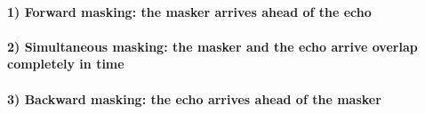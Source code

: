\documentclass[11pt]{article}
\begin{document}
\hypertarget{forward-masking-the-masker-arrives-ahead-of-the-echo}{%
\paragraph{1) Forward masking: the masker arrives ahead of the
echo}\label{forward-masking-the-masker-arrives-ahead-of-the-echo}}

\hypertarget{simultaneous-masking-the-masker-and-the-echo-arrive-overlap-completely-in-time}{%
\paragraph{2) Simultaneous masking: the masker and the echo arrive
overlap completely in
time}\label{simultaneous-masking-the-masker-and-the-echo-arrive-overlap-completely-in-time}}

\hypertarget{backward-masking-the-echo-arrives-ahead-of-the-masker}{%
\paragraph{3) Backward masking: the echo arrives ahead of the
masker}\label{backward-masking-the-echo-arrives-ahead-of-the-masker}}
\end{document}
